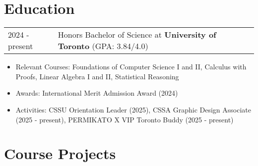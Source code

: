 \documentclass[a4paper,10pt]{article} %
\begin{document}
\section{Education}
\begin{tabularx}{\linewidth}{@{}l X@{}}
    2024 - present & Honors Bachelor of Science at \textbf{University of Toronto} \hfill \normalsize (GPA: 3.84/4.0) \\
\end{tabularx}
\begin{itemize}
    \item Relevant Courses: Foundations of Computer Science I and II, Calculus with Proofs, Linear Algebra I and II, Statistical Reasoning
    \item Awards: International Merit Admission Award (2024)
    \item Activities: CSSU Orientation Leader (2025), CSSA Graphic Design Associate (2025 - present), PERMIKATO X VIP Toronto Buddy (2025 - present)
\end{itemize}


\section{Course Projects}
\end{document}
